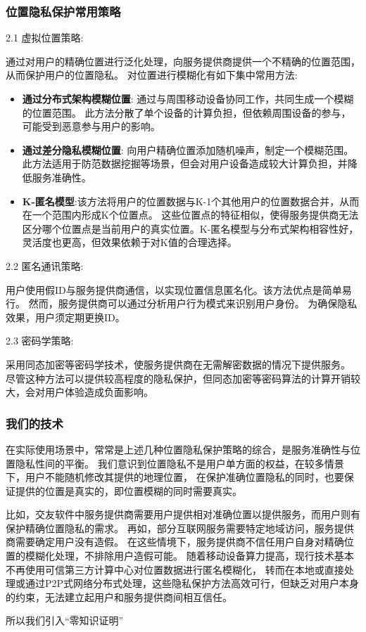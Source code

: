 \documentclass[zihao=-4]{ctexart}
\begin{document}
\subsubsection{位置隐私保护常用策略}
2.1 虚拟位置策略: \par
通过对用户的精确位置进行泛化处理，向服务提供商提供一个不精确的位置范围，从而保护用户的位置隐私。
对位置进行模糊化有如下集中常用方法:
\begin{itemize}
  \item \textbf{通过分布式架构模糊位置}: 通过与周围移动设备协同工作，共同生成一个模糊的位置范围。
  此方法分散了单个设备的计算负担，但依赖周围设备的参与，可能受到恶意参与用户的影响。
  \item \textbf{通过差分隐私模糊位置}: 向用户精确位置添加随机噪声，制定一个模糊范围。此方法适用于防范数据挖掘等场景，但会对用户设备造成较大计算负担，并降低服务准确性。
  \item \textbf{K-匿名模型}:该方法将用户的位置数据与K-1个其他用户的位置数据合并，从而在一个范围内形成K个位置点。
  这些位置点的特征相似，使得服务提供商无法区分哪个位置点是当前用户的真实位置。K-匿名模型与分布式架构相容性好，灵活度也更高，但效果依赖于对K值的合理选择。
\end{itemize}
\par
2.2 匿名通讯策略: \par
用户使用假ID与服务提供商通信，以实现位置信息匿名化。该方法优点是简单易行。
然而，服务提供商可以通过分析用户行为模式来识别用户身份。
为确保隐私效果，用户须定期更换ID。
\par
2.3 密码学策略: \par
采用同态加密等密码学技术，使服务提供商在无需解密数据的情况下提供服务。
尽管这种方法可以提供较高程度的隐私保护，但同态加密等密码算法的计算开销较大，会对用户体验造成负面影响。

\subsubsection{我们的技术}
在实际使用场景中，常常是上述几种位置隐私保护策略的综合，是服务准确性与位置隐私性间的平衡。
我们意识到位置隐私不是用户单方面的权益，在较多情景下，用户不能随机修改其提供的地理位置，
在保护准确位置隐私的同时，也要保证提供的位置是真实的，即位置模糊的同时需要真实。
\par
比如，交友软件中服务提供商需要用户提供相对准确位置以提供服务，而用户则有保护精确位置隐私的需求。
再如，部分互联网服务需要特定地域访问，服务提供商需要确定用户没有造假。
在这些情境下，服务提供商不信任用户自身对精确位置的模糊化处理，不排除用户造假可能。
随着移动设备算力提高，现行技术基本不再使用可信第三方计算中心对位置数据进行匿名模糊化，
转而在本地或直接处理或通过P2P式网络分布式处理，这些隐私保护方法高效可行，但缺乏对用户本身的约束，无法建立起用户和服务提供商间相互信任。
\par
所以我们引入“零知识证明”
\end{document}
